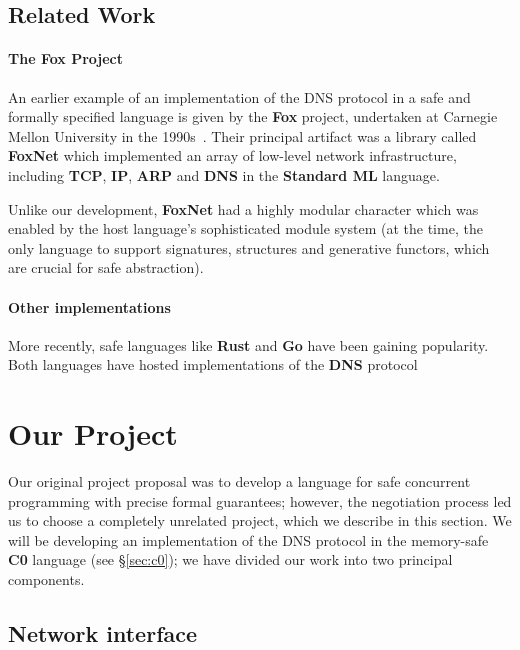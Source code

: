 \documentclass{article}
\newcommand\Kwd[1]{{\sffamily\bfseries{#1}}}
\begin{document}
\subsection{Related Work}

\paragraph{The \Kwd{Fox} Project}
An earlier example of an implementation of the DNS protocol in a safe
and formally specified language is given by the \Kwd{Fox} project,
undertaken at Carnegie Mellon University in the
1990s~\cite{biagioni-harper-lee-milnes:1994,
  biagioni-harper-lee:2001}. Their principal artifact was a library
called \Kwd{FoxNet} which implemented an array of low-level network
infrastructure, including \Kwd{TCP}, \Kwd{IP}, \Kwd{ARP} and \Kwd{DNS}
in the \Kwd{Standard ML} language.

Unlike our development, \Kwd{FoxNet} had a highly modular character
which was enabled by the host language's sophisticated module system
(at the time, the only language to support signatures, structures and
generative functors, which are crucial for safe abstraction).

\paragraph{Other implementations} More recently, safe languages like
\Kwd{Rust} and \Kwd{Go} have been gaining popularity. Both languages
have hosted implementations of the \Kwd{DNS}
protocol~\cite{github:trust-dns,github:miekg-dns}


\section{Our Project}\label{sec:our-project}

Our original project proposal was to develop a language for safe
concurrent programming with precise formal guarantees; however, the
negotiation process led us to choose a completely unrelated project,
which we describe in this section. We will be developing an
implementation of the DNS protocol in the memory-safe \Kwd{C0}
language (see \S\ref{sec:c0}); we have divided our work into two
principal components.

\subsection{Network interface}\label{sec:network-interface}
\end{document}

